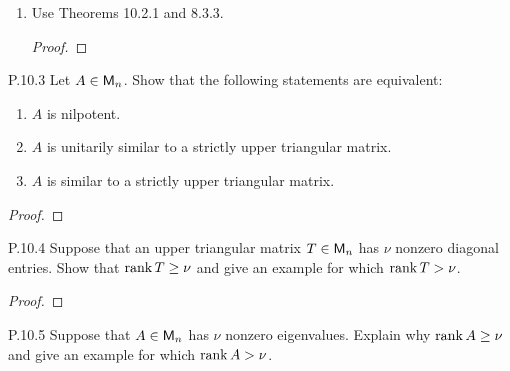 \documentclass{../homework}
\begin{document}
\begin{problems}
\begin{enumerate}
  \item Use Theorems 10.2.1 and 8.3.3.

    \begin{solution}
      \begin{proof}

      \end{proof}
    \end{solution}
  \end{enumerate}

\item[P.10.3] Let \(A \in \mathsf{M}_n\).  Show that the following statements
  are equivalent:
  \begin{enumerate}
  \item \(A\) is nilpotent.
  \item \(A\) is unitarily similar to a strictly upper triangular
    matrix.
  \item \(A\) is similar to a strictly upper triangular matrix.
  \end{enumerate}

  \begin{solution}
    \begin{proof}

    \end{proof}
  \end{solution}

\item[P.10.4] Suppose that an upper triangular matrix \(T \in \mathsf{M}_n\)
  has \(\nu\) nonzero diagonal entries.  Show that \(\operatorname{rank} T \ge \nu\)
  and give an example for which \(\operatorname{rank} T > \nu\).

  \begin{solution}
    \begin{proof}

    \end{proof}
  \end{solution}

\item[P.10.5] Suppose that \(A \in \mathsf{M}_n\) has \(\nu\) nonzero
  eigenvalues.  Explain why \(\operatorname{rank} A \ge \nu\) and give an example
  for which \(\operatorname{rank} A > \nu\).

  \begin{solution}

  \end{solution}
\end{problems}
\end{document}
